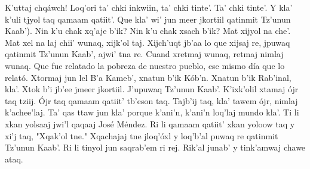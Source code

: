 \documentclass[12pt]{article}
\begin{document}
K'uttaj chq\'awch! Loq'ori ta' chki inkwiin, ta' chki tinte'. Ta' chki tinte'. Y kla' k'uli tjyol taq qamaam qatiit'. Que kla' wi' jun meer jkortiil qatinmit {Tz'unun Kaab'}). {Nin k'u chak} xq'aje b'ik? Nin k'u chak xsach b'ik? Mat xijyol na che'. Mat xel na laj chii' wunaq, xijk'ol taj. Xijch'uqt jb'aa lo que xijsaj re, jpuwaq qatinmit Tz'unun Kaab', {ajwi' tna} re. Cuand xretmaj wunaq, retmaj nimlaj wunaq. Que fue relatado la pobreza de nuestro pueblo, ese mismo d\'ia que lo relat\'o. Xtormaj jun lel B'a Kameb', xnatun b'ik K\'ob'n. Xnatun b'ik Rab'inal, kla'. Xtok b'i jb'ee jmeer jkortiil. J'upuwaq Tz'unun Kaab'. K'ixk'olil xtamaj \'ojr taq tziij. \'Ojr taq qamaam qatiit' tb'eson taq. Tajb'ij taq, kla' tawem \'ojr, nimlaj k'achee'laj. Ta' qas ttaw jun kla' porque k'ani'n, k'ani'n loq'laj mundo kla'. Ti li xkan yolsaaj jwi'l qaqaaj Jos\'e M\'endez. Ri li qamaam qatiit' xkan yoloow taq y xi'j taq, "Xqak'ol tne." Xqachajaj tne jloq'\'oxl y loq'b'al puwaq re qatinmit Tz'unun Kaab'. Ri li tinyol jun saqrab'em ri rej. Rik'al junab' y tink'amwaj chawe ataq. 
\end{document}
